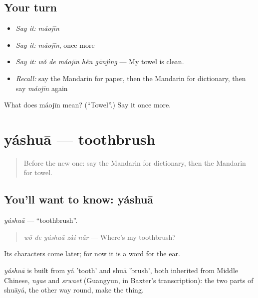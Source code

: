 \subsection*{Your turn}
\begin{itemize}
\raggedright
  \item \emph{Say it:} \emph{máojīn}
  \item \emph{Say it:} \emph{máojīn}, once more
  \item \emph{Say it:} \emph{wǒ de máojīn hěn gānjìng} — My towel is clean.
  \item \emph{Recall:} say the Mandarin for paper, then the Mandarin for dictionary, then say \emph{máojīn} again
\end{itemize}

\begin{tcolorbox}[breakable,colback=teal!4,colframe=teal!35!black,title={Before you move on}]
What does máojīn mean? (\textquotedblleft{}Towel\textquotedblright{}.) Say it once more.
\end{tcolorbox}
\section[yáshuā]{yáshuā — toothbrush}

\label{lesson:ZH-C105-yashua}



\begin{quote}
Before the new one: say the Mandarin for dictionary, then the Mandarin for towel.
\end{quote}

\subsection*{You'll want to know: yáshuā}
\emph{yáshuā} — \textquotedblleft{}toothbrush\textquotedblright{}.

\begin{quote}
\emph{wǒ de yáshuā zài nǎr} — Where's my toothbrush?
\end{quote}

Its characters come later; for now it is a word for the ear.

\begin{cousinweb}
\emph{yáshuā} is built from yá 'tooth' and shuā 'brush', both inherited from Middle Chinese, \emph{ngae} and \emph{srwaet} (Guangyun, in Baxter's transcription): the two parts of shuāyá, the other way round, make the thing.
\end{cousinweb}

